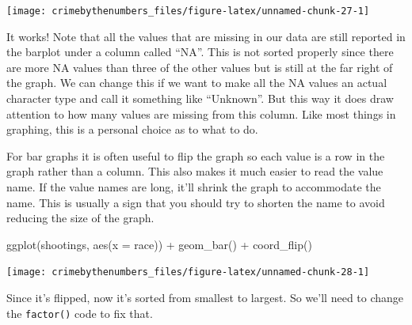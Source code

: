 \documentclass[
]{krantz}
\makeatletter
\newenvironment{Shaded}{\begin{snugshade}}{\end{snugshade}}
\newcommand{\AttributeTok}[1]{\textcolor[rgb]{0.61,0.61,0.61}{#1}}
\newcommand{\ConstantTok}[1]{\textcolor[rgb]{0,0,0}{#1}}
\newcommand{\FunctionTok}[1]{\textcolor[rgb]{0,0,0}{#1}}
\newcommand{\NormalTok}[1]{#1}
\newcommand{\OtherTok}[1]{\textcolor[rgb]{0.37,0.37,0.37}{#1}}
\newcommand{\SpecialCharTok}[1]{\textcolor[rgb]{0,0,0}{#1}}
\newenvironment{kframe}{%
\medskip{}
\setlength{\fboxsep}{.8em}
 \def\at@end@of@kframe{}%
 \ifinner\ifhmode%
  \def\at@end@of@kframe{\end{minipage}}%
  \begin{minipage}{\columnwidth}%
 \fi\fi%
 \def\FrameCommand##1{\hskip\@totalleftmargin \hskip-\fboxsep
 \colorbox{shadecolor}{##1}\hskip-\fboxsep
     \hskip-\linewidth \hskip-\@totalleftmargin \hskip\columnwidth}%
 \MakeFramed {\advance\hsize-\width
   \@totalleftmargin\z@ \linewidth\hsize
   \@setminipage}}%
 {\par\unskip\endMakeFramed%
 \at@end@of@kframe}
\renewenvironment{Shaded}{\begin{kframe}}{\end{kframe}}
\makeatother
\begin{document}
\begin{center}\texttt{[image: crimebythenumbers\_files/figure-latex/unnamed-chunk-27-1]} \end{center}

It works! Note that all the values that are missing in our data are still reported in the barplot under a column called ``NA''. This is not sorted properly since there are more NA values than three of the other values but is still at the far right of the graph. We can change this if we want to make all the NA values an actual character type and call it something like ``Unknown''. But this way it does draw attention to how many values are missing from this column. Like most things in graphing, this is a personal choice as to what to do.

For bar graphs it is often useful to flip the graph so each value is a row in the graph rather than a column. This also makes it much easier to read the value name. If the value names are long, it'll shrink the graph to accommodate the name. This is usually a sign that you should try to shorten the name to avoid reducing the size of the graph.

\begin{Shaded}
\begin{Highlighting}[]
\FunctionTok{ggplot}\NormalTok{(shootings, }\FunctionTok{aes}\NormalTok{(}\AttributeTok{x =}\NormalTok{ race)) }\SpecialCharTok{+} 
  \FunctionTok{geom\_bar}\NormalTok{() }\SpecialCharTok{+}
  \FunctionTok{coord\_flip}\NormalTok{() }
\end{Highlighting}
\end{Shaded}

\begin{center}\texttt{[image: crimebythenumbers\_files/figure-latex/unnamed-chunk-28-1]} \end{center}

Since it's flipped, now it's sorted from smallest to largest. So we'll need to change the \texttt{factor()} code to fix that.

\begin{Shaded}
\end{Shaded}
\end{document}

